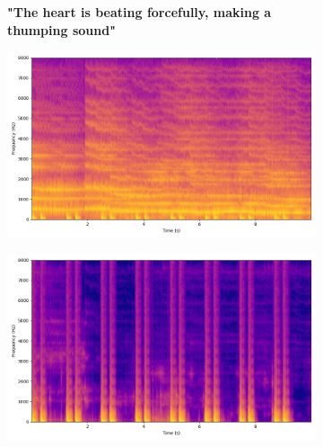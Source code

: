 \begin{figure}[!htbp]
    \centering
    \begin{subfigure}[b]{0.185\textwidth}
        \centering
        \scriptsize\textbf{"The heart is beating forcefully, making a thumping sound"}
        \vspace{5.0mm}
    \end{subfigure}
    \begin{subfigure}[b]{0.185\textwidth}
        \centering
        \includegraphics[width=\textwidth]{plots/onepeace_best_sdr/onepeace mixture_spectrogram.png}
    \end{subfigure}
    \begin{subfigure}[b]{0.185\textwidth}
        \centering
        \includegraphics[width=\textwidth]{plots/onepeace_best_sdr/onepeace sep_spectrogram.png}
    \end{subfigure}
    \begin{subfigure}[b]{0.185\textwidth}
        \centering

\end{subfigure}
\end{figure}
